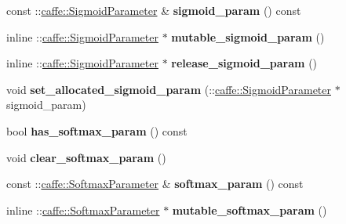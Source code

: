 \begin{DoxyCompactItemize}
const \+::\mbox{\hyperlink{classcaffe_1_1_sigmoid_parameter}{caffe\+::\+Sigmoid\+Parameter}} \& {\bfseries sigmoid\+\_\+param} () const
\item 
\mbox{\label{classcaffe_1_1_v1_layer_parameter_a57326a0255ef4fd9444e0ba53a50b252}} 
inline \+::\mbox{\hyperlink{classcaffe_1_1_sigmoid_parameter}{caffe\+::\+Sigmoid\+Parameter}} $\ast$ {\bfseries mutable\+\_\+sigmoid\+\_\+param} ()
\item 
\mbox{\label{classcaffe_1_1_v1_layer_parameter_a3bd3b23a28974f221d72fedc7dbbc3ce}} 
inline \+::\mbox{\hyperlink{classcaffe_1_1_sigmoid_parameter}{caffe\+::\+Sigmoid\+Parameter}} $\ast$ {\bfseries release\+\_\+sigmoid\+\_\+param} ()
\item 
\mbox{\label{classcaffe_1_1_v1_layer_parameter_ab09188c18c497536489b3d99b8beff35}} 
void {\bfseries set\+\_\+allocated\+\_\+sigmoid\+\_\+param} (\+::\mbox{\hyperlink{classcaffe_1_1_sigmoid_parameter}{caffe\+::\+Sigmoid\+Parameter}} $\ast$sigmoid\+\_\+param)
\item 
\mbox{\label{classcaffe_1_1_v1_layer_parameter_a7d91291ea192a4305fe884cae9bd8644}} 
bool {\bfseries has\+\_\+softmax\+\_\+param} () const
\item 
\mbox{\label{classcaffe_1_1_v1_layer_parameter_a5d67ba7462f227738aa50283b9a93ed2}} 
void {\bfseries clear\+\_\+softmax\+\_\+param} ()
\item 
\mbox{\label{classcaffe_1_1_v1_layer_parameter_ac6194ce3a0fe4819801a7f89883e9df0}} 
const \+::\mbox{\hyperlink{classcaffe_1_1_softmax_parameter}{caffe\+::\+Softmax\+Parameter}} \& {\bfseries softmax\+\_\+param} () const
\item 
\mbox{\label{classcaffe_1_1_v1_layer_parameter_adc75541af3c9b0d1dce5f796a7281672}} 
inline \+::\mbox{\hyperlink{classcaffe_1_1_softmax_parameter}{caffe\+::\+Softmax\+Parameter}} $\ast$ {\bfseries mutable\+\_\+softmax\+\_\+param} ()
\item 
\mbox{\label{classcaffe_1_1_v1_layer_parameter_a594120da6931d23c0c932ab493b345be}} 

\end{DoxyCompactItemize}
